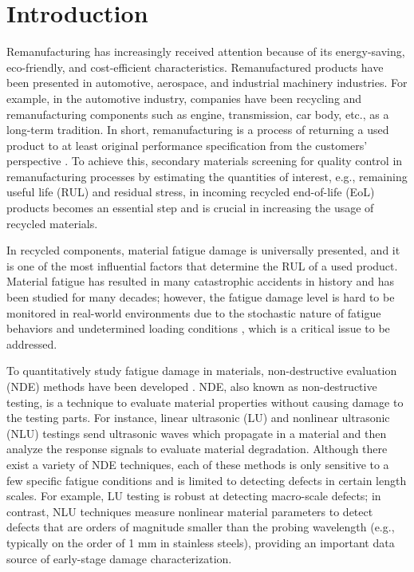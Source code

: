 \chapter{Introduction}
\label{chap: intro}
Remanufacturing has increasingly received attention because of its energy-saving, eco-friendly, and cost-efficient characteristics. Remanufactured products have been presented in automotive, aerospace, and industrial machinery industries. For example, in the automotive industry, companies have been recycling and remanufacturing components such as engine, transmission, car body, etc., as a long-term tradition. In short, remanufacturing is a process of returning a used product to at least original performance specification from the customers’ perspective \cite{remanufacturing-IJOMAH2004}. To achieve this, secondary materials screening for quality control in remanufacturing processes by estimating the quantities of interest, e.g., remaining useful life (RUL) and residual stress, in incoming recycled end-of-life (EoL) products becomes an essential step and is crucial in increasing the usage of recycled materials. 

In recycled components, material fatigue damage is universally presented, and it is one of the most influential factors that determine the RUL of a used product. Material fatigue has resulted in many catastrophic accidents in history and has been studied for many decades; however, the fatigue damage level is hard to be monitored in real-world environments due to the stochastic nature of fatigue behaviors and undetermined loading conditions \cite{fatigue-review-Santecchia2016}, which is a critical issue to be addressed.

To quantitatively study fatigue damage in materials, non-destructive evaluation (NDE) methods have been developed \cite{nde-review-ACHENBACH200013,nde-review-WISNER2020}. NDE, also known as non-destructive testing, is a technique to evaluate material properties without causing damage to the testing parts. For instance, linear ultrasonic (LU) 
and nonlinear ultrasonic (NLU) testings 
send ultrasonic waves which propagate in a material and then analyze the response signals to evaluate material degradation. Although there exist a variety of NDE techniques,
each of these methods is only sensitive to a few specific fatigue conditions and is limited to detecting defects in certain length scales. For example, LU testing is robust at detecting macro-scale defects; in contrast, NLU techniques measure nonlinear material parameters to detect defects that are orders of magnitude smaller than the probing wavelength (e.g., typically on the order of 1 mm in stainless steels), providing an important data source of early-stage damage characterization.

